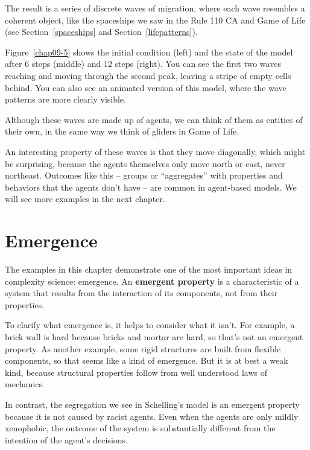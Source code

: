 \documentclass[12pt]{book}
\theoremstyle{exercise}
\begin{document}
The result is a series of discrete waves of migration, where each wave
resembles a coherent object, like the spaceships we saw in the Rule
110 CA and Game of Life (see Section~\ref{spaceships} and
Section~\ref{lifepatterns}).

Figure~\ref{chap09-5} shows the initial condition (left) and the
state of the model after 6 steps (middle) and 12 steps (right).
You can see the first two waves reaching and moving through the
second peak, leaving a stripe of empty cells behind.  You can also
see an animated version of this model, where the wave patterns are
more clearly visible.

Although these waves are made up of agents, we can think of them
as entities of their own, in the same way we think of gliders in
Game of Life.

An interesting property of these waves is that they
move diagonally, which might be surprising, because the agents
themselves only move north or east, never northeast.  Outcomes
like this -- groups or ``aggregates'' with properties and behaviors
that the agents don't have -- are common in agent-based models.
We will see more examples in the next chapter.


\section{Emergence}

The examples in this chapter demonstrate one of the most important
ideas in complexity science: emergence.  An {\bf emergent property} is
a characteristic of a system that results from the interaction of its
components, not from their properties.


To clarify what emergence is, it helps to consider what it isn't.  For
example, a brick wall is hard because bricks and mortar are hard, so
that's not an emergent property.  As another example, some rigid
structures are built from flexible components, so that seems like a
kind of emergence.  But it is at best a weak kind, because structural
properties follow from well understood laws of mechanics.


In contrast, the segregation we see in Schelling's model is an emergent
property because it is not caused by racist agents.  Even when the
agents are only mildly xenophobic, the outcome of the system is
substantially different from the intention of the agent's decisions.
\end{document}
